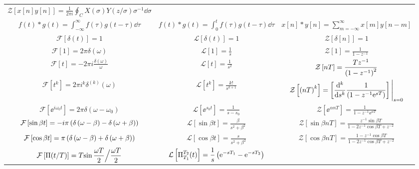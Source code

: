 \documentclass[a4j,10pt]{jarticle}
\def\F{\mathcal F}
\def\Ft{t}
\def\Ff{f}
\def\Fft{\Ff(\Ft)}
\def\Fg{g}
\def\Fgt{\Fg(\Ft)}
\def\Fw{\omega}
\def\Fof#1{\F\left[#1\right]}
\def\L{\mathcal L}
\def\Lt{t}
\def\Lf{f}
\def\Lft{\Lf(\Lt)}
\def\Lg{g}
\def\Lgt{\Lg(\Lt)}
\def\Lw{s}
\def\Lof#1{\L\left[#1\right]}
\def\Z{\mathcal Z}
\def\Zt{n}
\def\Zf{x}
\def\Zft{\Zf[\Zt]}
\def\Zg{y}
\def\Zgt{\Zg[\Zt]}
\def\Zw{z}
\def\ZZ{X}
\def\ZG{Y}
\def\Zof#1{\Z\left[#1\right]}
\def\jj{i}
\def\iii#1#2{\int_{-\infty}^\infty#2\dd#1}
\def\sii#1#2{\sum_{#1=-\infty}^\infty#2}
\def\ds{\displaystyle}
\def\convolution#1#2{#1*#2}
\def\kakeru#1#2{#1#2}
\begin{document}
\begin{table}[htbp]
\begin{center}
\begin{tabular}{ccc}
$\ds \Zof{\kakeru\Zft\Zgt} = \frac 1 {2\pi\jj} {\oint_C\ZZ(\sigma)\ZG(\Zw/\sigma)\sigma^{-1}\dd\sigma}$
\\
$\ds \convolution\Fft\Fgt = \iii\tau{\Ff(\tau)\Fg(\Ft-\tau)}$ &
$\ds \convolution\Lft\Lgt = \int_0^t{\Lf(\tau)\Lg(\Lt-\tau)}\dd\tau$ &
$\ds \convolution\Zft\Zgt = \sii m {\Zf[m]\Zg[\Zt-m]}$
\\
\hline
$\ds \Fof{\delta(\Ft)} = 1$ &
$\ds \Lof{\delta(\Lt)} = 1$ &
$\ds \Zof{\delta[\Zt]} = 1$
\\
$\ds \Fof{1} = 2\pi\delta(\Fw)$ &
$\ds \Lof{1} = \frac 1 \Lw$ &
$\ds \Zof{1} = \frac 1 {1-\Zw^{-1}}$
\\
$\ds \Fof{\Ft} = -2\pi\jj\frac{\delta(\Fw)}{\Fw}$ &
$\ds \Lof{\Lt} = \frac{1}{\Lw^2}$ &
$\ds \Zof{\Zt T} = \frac{T\Zw^{-1}}{\paren{1-\Zw^{-1}}^2}$
\\
$\ds \Fof{\Ft^k} = 2\pi\jj^k\delta^{(k)}(\Fw)$ &
$\ds \Lof{\Lt^k} = \frac{k!}{\Lw^{k+1}}$ &
$\ds \Zof{\paren{\Zt T}^k} = \left[ \diffn[k]{}{s}\frac 1 {\paren{1-\Zw^{-1}\ee^{sT}}}\right]\Bigg|_{s=0}$
\\
$\ds \Fof{\ee^{\jj\Fw_0\Ft}} = 2\pi\delta(\Fw-\Fw_0)$ &
$\ds \Lof{\ee^{   \Lw_0\Lt}} = \frac 1 {\Lw-\Lw_0}$ &
$\ds \Zof{\ee^{\alpha\Zt T}} = \frac 1 {1 - z^{-1}\ee^{\alpha T}}$
\\
$\ds \Fof{\sin{\beta\Ft}} = -\jj\pi\paren{\delta\paren{\Fw-\beta}-\delta\paren{\Fw+\beta}}$ &
$\ds \Lof{\sin{\beta\Lt}} = \frac{\beta}{\Lw^2+\beta^2}$ &
$\ds \Zof{\sin{\beta\Zt T}} = \frac{\Zw^{-1}\sin{\beta T}}{1-2\Zw^{-1}\cos{\beta T}+\Zw^{-2}}$
\\
$\ds \Fof{\cos{\beta\Ft}} = \pi\paren{\delta\paren{\Fw-\beta}+\delta\paren{\Fw+\beta}}$ &
$\ds \Lof{\cos{\beta\Lt}} = \frac{\Lw}{\Lw^2+\beta^2}$ &
$\ds \Zof{\cos{\beta\Zt T}} = \frac{1-\Zw^{-1}\cos{\beta T}}{1-2\Zw^{-1}\cos{\beta T}+\Zw^{-2}}$
\\
$\ds \Fof{\Pi{\paren{\Ft/T}}} = T{\sin\frac{\Fw T}{2}}\Big/{\frac{\Fw T}{2}}$ &
$\ds \Lof{\Pi_{T_1}^{T_2}{\paren{\Lt}}} = \frac 1 \Lw \paren{\ee^{-\Lw T_1}-\ee^{-\Lw T_2}}$ &
\\
\bottomrule
\end{tabular}
\end{center}
\end{table}
\end{document}
